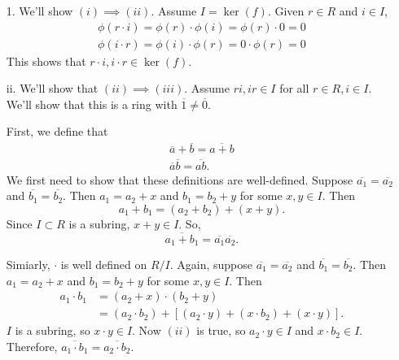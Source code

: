     \begin{prf}
        \begin{itemize}
            \item[1.] We'll show $(i) \implies (ii)$. Assume $I =
            \ker(f)$. Given $r \in R$ and $i \in I$, 
            \begin{align*}
                \phi(r \cdot i) = \phi(r)\cdot\phi(i) = \phi(r)\cdot 0 = 0\\
                \phi(i \cdot r) = \phi(i)\cdot\phi(r) = 0 \cdot\phi(r) = 0
            \end{align*}
            This shows that $r \cdot i, i \cdot r \in \ker(f)$. 

            \item[ii.] We'll show that $(ii) \implies (iii)$.
            Assume $ri, ir \in I$ for all $r \in R, i \in I$.
            We'll show that this is a ring with $\overline{1} \ne
            \overline{0}$. 

            First, we define that 
            \begin{align*}
                \overline{a} + \overline{b} = \overline{a + b}\\
                \overline{a}\overline{b} =\overline{ab}.
            \end{align*}
            We first need to show that these definitions are
            well-defined. Suppose $\overline{a_1} =
            \overline{a_2}$ and $\overline{b_1} = \overline{b_2}$.
            Then $a_1 = a_2 + x$ and $b_1 = b_2 + y$ for some
            $x,y\in I$. Then 
            \[
                a_1 + b_1 = (a_2 + b_2) + (x + y).
            \]
            Since $I \subset R$ is a subring, $x+y \in I$. So, 
            \[
                \overline{a_1 + b_1} = \overline{a_1}\overline{a_2}.   
            \]

            Simiarly, $\cdot$ is well defined on $R/I$. Again, suppose $\overline{a_1} =
            \overline{a_2}$ and $\overline{b_1} = \overline{b_2}$.
            Then $a_1 = a_2 + x$ and $b_1 = b_2 + y$ for some
            $x,y\in I$. Then 
            \begin{align*}  
                a_1 \cdot b_1 & = (a_2 + x) \cdot (b_2 + y)\\
                & = (a_2\cdot b_2) + [(a_2 \cdot y) +(x \cdot b_2) + (x \cdot y)].
            \end{align*}    
            $I$ is a subring, so $x \cdot y \in I$. Now $(ii)$ is
            true, so $a_2 \cdot y \in I$ and $x \cdot b_2 \in I$.
            Therefore, $\overline{a_1\cdot b_1} = \overline{a_2
            \cdot b_2}$. 


\end{itemize}
\end{prf}

